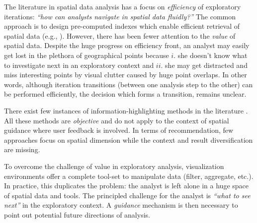 \documentclass{vldb}
\newtheorem{example}{Example}
\begin{document}
The literature in spatial data analysis has a focus on {\em efficiency} of exploratory iterations: {\em ``how can analysts navigate in spatial data fluidly?''} The common approach is to design pre-computed indexes which enable efficient retrieval of spatial data (e.g., \cite{lins2013nanocubes}). However, there has been fewer attention to the {\em value} of spatial data. Despite the huge progress on efficiency front, an analyst may easily get lost in the plethora of geographical points because $i.$ she doesn't know what to investigate next in an exploratory context and $ii.$ she may get distracted and miss interesting points by visual clutter caused by huge point overlaps. In other words, although iteration transitions (between one analysis step to the other) can be performed efficiently, the decision which forms a transition, remains unclear.



There exist few instances of information-highlighting methods in the literature \cite{Liang2010,Robinson2011,wongsuphasawat2016voyager,willett2007scented}. All these methods are {\em objective} and do not apply to the context of spatial guidance where user feedback is involved.  In terms of recommendation, few approaches focus on spatial dimension \cite{Bao2015,Levandoski:2012} while the context and result diversification are missing.
 



To overcome the challenge of value in exploratory analysis, visualization environments offer a complete tool-set to manipulate data (filter, aggregate, etc.). In practice, this duplicates the problem: the analyst is left alone in a huge space of spatial data and tools. The principled challenge for the analyst is {\em ``what to see next''} in the exploratory context. A {\em guidance} mechanism is then necessary to point out potential future directions of analysis.
\end{document}
